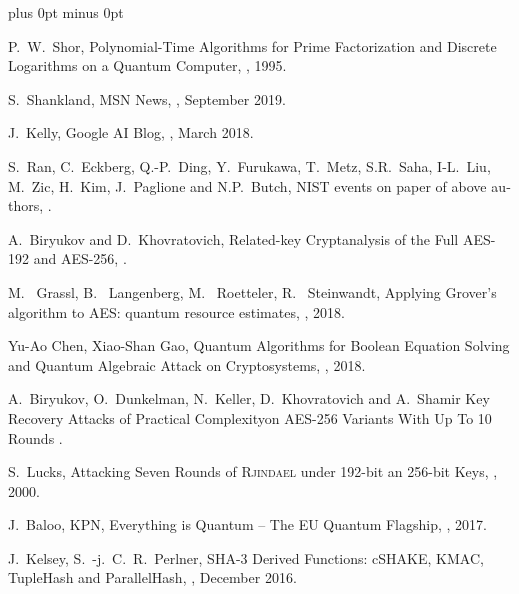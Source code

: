 \documentclass[a4paper,11pt]{article}
\begin{document}
\begin{otherlanguage}{english}
\begin{multicols}{2}
\begin{thebibliography}{1}
\itemsep=0cm plus 0pt minus 0pt

P.~W.~Shor,
\newblock Polynomial-Time Algorithms for Prime Factorization and Discrete Logarithms on a Quantum Computer,
, 1995.


  S.~Shankland,
  \newblock MSN News,
  , September 2019.

  J.~Kelly,
  \newblock Google AI Blog,
  , March 2018.

  S.~Ran, C.~Eckberg, Q.-P.~Ding, Y.~Furukawa, T.~Metz, S.R.~Saha, I-L.~Liu, M.~Zic, H.~Kim, J.~Paglione and N.P.~Butch,
  \newblock NIST events on paper of above authors,
  .

A.~Biryukov and D.~Khovratovich,
\newblock Related-key Cryptanalysis of the Full AES-192 and AES-256,
.


M.~ Grassl, B.~ Langenberg, M.~ Roetteler, R.~ Steinwandt,
\newblock Applying Grover’s algorithm to AES: quantum resource estimates,
, 2018.

Yu-Ao Chen, Xiao-Shan Gao,
\newblock Quantum Algorithms for Boolean Equation Solving and Quantum Algebraic Attack on Cryptosystems,
, 2018.

A.~Biryukov, O.~Dunkelman, N.~Keller, D.~Khovratovich and A.~Shamir
\newblock Key Recovery Attacks of Practical Complexityon AES-256 Variants With Up To 10 Rounds
.

S.~Lucks,
\newblock Attacking Seven Rounds of \textsc{Rjindael} under 192-bit an 256-bit Keys,
, 2000.

J.~Baloo, KPN,
\newblock Everything is Quantum – The EU Quantum Flagship, 
, 2017.

J.~Kelsey, S.~-j.~C.~R.~Perlner,
\newblock SHA-3 Derived Functions: cSHAKE, KMAC, TupleHash and ParallelHash, 
, December 2016.


\end{thebibliography}
\end{multicols}
\end{otherlanguage}
\end{document}
